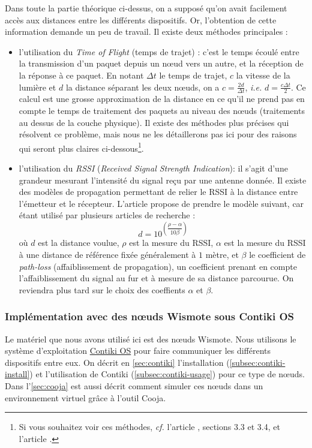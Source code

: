 \documentclass[french, a4paper, 12pt, parskip]{scrartcl}
\begin{document}
Dans toute la partie théorique ci-dessus, on a supposé qu'on avait facilement
accès aux distances entre les différents dispositifs. Or, l'obtention de cette
information demande un peu de travail. Il existe deux méthodes principales :
\begin{itemize}
  \item l'utilisation du \textit{Time of Flight} (temps de trajet) : c'est le
    temps écoulé entre la transmission d'un paquet depuis un nœud vers un
    autre, et la réception de la réponse à ce paquet. En notant $\Delta t$ le
    temps de trajet, $c$ la vitesse de la lumière et $d$ la distance séparant
    les deux nœuds, on a $c = \frac{2d}{\Delta t}$, \textit{i.e.} $d =
    \frac{c\Delta t}{2}$. Ce calcul est une grosse approximation de la distance
    en ce qu'il ne prend pas en compte le temps de traitement des paquets au
    niveau des nœuds (traitements au dessus de la couche physique). Il existe
    des méthodes plus précises qui résolvent ce problème, mais nous ne les
    détaillerons pas ici pour des raisons qui seront plus claires
    ci-dessous\footnote{Si vous souhaitez voir ces méthodes,
    \textit{cf.} l'article \cite{UWB}, sections 3.3 et 3.4, et l'article
    \cite{TOF}.}.
  \item l'utilisation du \textit{RSSI} (\textit{Received Signal Strength
    Indication}): il s'agit d'une grandeur mesurant l'intensité du signal reçu
    par une antenne donnée. Il existe des modèles de propagation permettant de
    relier le RSSI à la distance entre l'émetteur et le récepteur. L'article
    \cite{RSSI} propose de prendre le modèle suivant, car étant utilisé par
    plusieurs articles de recherche :
    \[
      d = 10^{\left(\dfrac{\rho-\alpha}{10\beta}\right)} 
    \]
    où $d$ est la distance voulue, $\rho$ est la mesure du RSSI, $\alpha$ est
    la mesure du RSSI à une distance de référence fixée généralement à $1$
    mètre, et $\beta$ le coefficient de \textit{path-loss} (affaiblissement de
    propagation), un coefficient prenant en compte l'affaiblissement du signal
    au fur et à mesure de sa distance parcourue. On reviendra plus tard sur le
    choix des coeffients $\alpha$ et $\beta$.
\end{itemize}

\subsubsection{Implémentation avec des nœuds Wismote sous Contiki OS}

Le matériel que nous avons utilisé ici est des nœuds Wismote. Nous utilisons le
système d'exploitation \href{https://github.com/contiki-os/contiki}{Contiki OS}
pour faire communiquer les différents dispositifs entre eux. On décrit en
\autoref{sec:contiki} l'installation (\autoref{subsec:contiki-install}) et
l'utilisation de Contiki (\autoref{subsec:contiki-usage}) pour ce type de nœuds.
Dans l'\autoref{sec:cooja} est aussi décrit comment simuler ces nœuds dans un
environnement virtuel grâce à l'outil Cooja.
\end{document}
